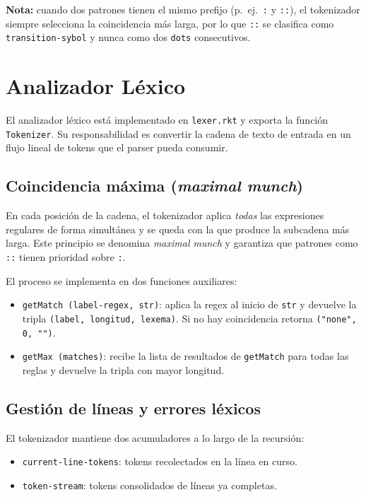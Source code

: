 \documentclass{article}
\begin{document}
\noindent\textbf{Nota:} cuando dos patrones tienen el mismo prefijo (p.~ej.\ \texttt{:} y \texttt{::}),
el tokenizador siempre selecciona la coincidencia más larga, por lo que \texttt{::}
se clasifica como \texttt{transition-sybol} y nunca como dos \texttt{dots} consecutivos.

\section{Analizador Léxico}

El analizador léxico está implementado en \texttt{lexer.rkt} y exporta la función \texttt{Tokenizer}.
Su responsabilidad es convertir la cadena de texto de entrada en un flujo lineal de tokens
que el parser pueda consumir.

\subsection{Coincidencia máxima (\textit{maximal munch})}

En cada posición de la cadena, el tokenizador aplica \emph{todas} las expresiones regulares
de forma simultánea y se queda con la que produce la subcadena más larga.
Este principio se denomina \textit{maximal munch} y garantiza que patrones como
\texttt{::} tienen prioridad sobre \texttt{:}.

El proceso se implementa en dos funciones auxiliares:

\begin{itemize}
  \item \texttt{getMatch (label-regex, str)}: aplica la regex al inicio de \texttt{str}
        y devuelve la tripla \texttt{(label, longitud, lexema)}.
        Si no hay coincidencia retorna \texttt{("none", 0, "")}.
  \item \texttt{getMax (matches)}: recibe la lista de resultados de \texttt{getMatch}
        para todas las reglas y devuelve la tripla con mayor longitud.
\end{itemize}

\subsection{Gestión de líneas y errores léxicos}

El tokenizador mantiene dos acumuladores a lo largo de la recursión:

\begin{itemize}
  \item \texttt{current-line-tokens}: tokens recolectados en la línea en curso.
  \item \texttt{token-stream}: tokens consolidados de líneas ya completas.
\end{itemize}
\end{document}
